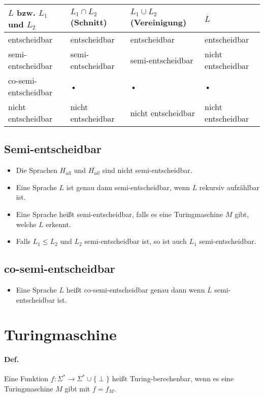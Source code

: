 \begin{table}[htb!]
\centering
\begin{tabular}{l|l|l|l}
$L$ bzw. $L_1$ und $L_2$ & $L_1 \cap L_2$ (Schnitt) & $L_1 \cup L_2$ (Vereinigung) & $\overline{L}$ \\
\hline
entscheidbar & entscheidbar & entscheidbar & entscheidbar \\
semi-entscheidbar & semi-entscheidbar & semi-entscheidbar & nicht entscheidbar \\
co-semi-entscheidbar & • & • & • \\
nicht entscheidbar & nicht entscheidbar & nicht entscheidbar & nicht entscheidbar \\
\end{tabular} 
\end{table}

\subsection{Semi-entscheidbar}

\begin{itemize}
	\item Die Sprachen $H_{all}$ und $\overline{H_{all}}$ sind nicht semi-entscheidbar.
	\item Eine Sprache $L$ ist genau dann semi-entscheidbar, wenn $L$ rekursiv aufzählbar ist.
	\item Eine Sprache heißt semi-entscheidbar, falls es eine Turingmaschine $M$ gibt, welche $L$ erkennt.
	\item Falls $L_1 \leq L_2$ und $L_2$ semi-entscheidbar ist, so ist auch $L_1$ semi-entscheidbar.
\end{itemize}

\subsection{co-semi-entscheidbar}

\begin{itemize}
	\item Eine Sprache $L$ heißt co-semi-entscheidbar genau dann wenn $\overline{L}$ semi-entscheidbar ist.
\end{itemize}


\section{Turingmaschine}
\paragraph*{Def.} Eine Funktion $f:\Sigma^* \rightarrow\Sigma^* \cup \{ \perp \}$ heißt Turing-berechenbar, wenn es eine Turingmaschine $M$ gibt mit $f=f_M$.
